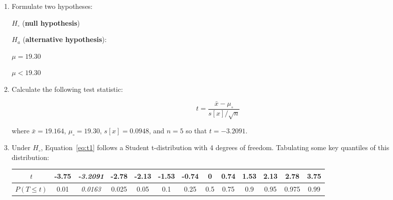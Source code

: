 \begin{enumerate}
\item  Formulate two hypotheses:\\

  \noindent\begin{minipage}{.4\textwidth}
    $H_\circ$ (\textbf{null hypothesis})
    
    \vspace{1em}
    
    $H_a$ (\textbf{alternative hypothesis}):
  \end{minipage}
  \begin{minipage}{.2\textwidth}
  \end{minipage}
  \begin{minipage}{.2\textwidth}
    $\mu=19.30$
    
    \vspace{1em}
    
    $\mu<{19.30}$
  \end{minipage}
  \begin{minipage}{.2\textwidth}
  \end{minipage}
  
\item Calculate the following test statistic:

  \begin{equation}
    t = \frac{\bar{x} - \mu_\circ}{s[x]/\sqrt{n}}
    \label{eq:t1}
  \end{equation}

  \noindent where $\bar{x} = 19.164$, $\mu_\circ = 19.30$, 
  $s[x] = 0.0948$, and $n = 5$ so that $t = -3.2091$.

\item Under $H_\circ$, Equation~\ref{eq:t1} follows a Student
  t-distribution with 4 degrees of freedom. Tabulating some key
  quantiles of this distribution:

  \begin{center}
    \begin{tabular}{c|c@{\gap}c@{\gap}c@{\gap}c@{\gap}
        c@{\gap}c@{\gap}c@{\gap}c@{\gap}c@{\gap}c@{\gap}c@{\gap}c}
      $t$ & -3.75 & \textit{-3.2091} & -2.78 & -2.13 & -1.53 & -0.74 &
      0 & 0.74 & 1.53 & 2.13 & 2.78 & 3.75 \\ \hline
      $P(T\leq{t})$ & 0.01 & \textit{0.0163} & 0.025 & 0.05 & 0.1 & 0.25 &
      0.5 & 0.75 & 0.9 & 0.95 & 0.975 & 0.99
    \end{tabular}
  \end{center}


\end{enumerate}

